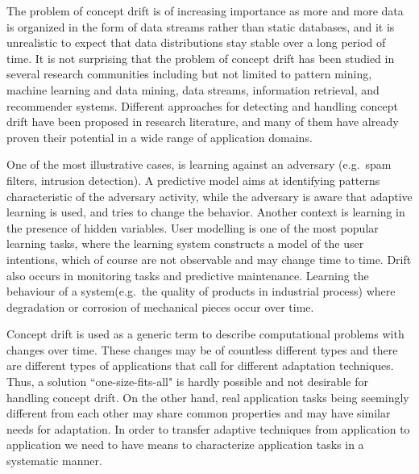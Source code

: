 \documentclass{llncs}
\begin{document}
The problem of concept drift is of increasing importance as more and more data is organized in the form of data streams rather than static databases,
and it is unrealistic to expect that data distributions stay stable over a long period of time.
It is not surprising that the problem of concept drift has been studied in several research communities including but not limited to pattern mining, machine learning and data mining, data streams, information retrieval, and recommender systems.
Different approaches for detecting and handling concept drift have been proposed in research literature, and many of them have already proven their potential in a wide range of application domains.

One of the most illustrative cases, is learning against
an adversary (e.g.\ spam filters, intrusion detection). A predictive model aims at
identifying patterns characteristic of the adversary activity, while the
adversary is aware that adaptive learning is used, and tries to change the behavior.
Another context is learning in the presence of hidden variables. User
modelling is one of the most popular learning tasks, where the learning
system constructs a model of the user intentions, which of course are not
observable and may change time to time. Drift also occurs in monitoring
tasks and predictive maintenance. Learning the behaviour of a system(e.g.\
the quality of products in industrial process)  where degradation or
corrosion of mechanical pieces occur over time.

Concept drift is used as a generic term to describe computational problems with changes over time.
These changes may be of countless different types and there are different types of applications that call for different adaptation techniques.
Thus, a solution ``one-size-fits-all" is hardly possible and not desirable for handling concept drift.
On the other hand, real application tasks being seemingly different from each other may share common properties and may have similar needs for adaptation. In order to transfer adaptive techniques from application to application we need to have means to characterize application tasks in a systematic manner.
\end{document}
